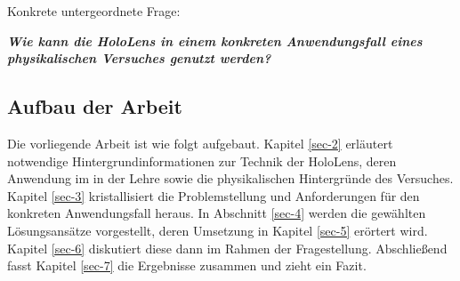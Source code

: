 Konkrete untergeordnete Frage:
\begin{center}
	\textit{\textbf{Wie kann die HoloLens in einem konkreten Anwendungsfall eines physikalischen Versuches genutzt werden?}}
\end{center}

\begin{comment}
\subsection{Aufgabenstellung}

Im Rahmen der Arbeit soll anhand der HoloLens untersucht werden, wie diese in der Physik-Lehre eingesetzt werden kann, um physikalische Inhalte zu vermitteln. Insbesondere soll betrachtet werden, wie physikalische Experimente mittels Mixed Reality Anwendungen durch zusätzliche Inhalte angereichert werden können.\\

\par
Dazu sind zunächst die technischen Möglichkeiten und Voraussetzungen der HoloLens zu betrachten und in Zusammenhang mit dem Anwendungsfall zu bringen. Weiterhin sind bestehende Ansätze im Einsatz von Mixed Reality Technologie in der Lehre, besonders in der Physik-Lehre, herauszuarbeiten und einzuordnen.

Davon ausgehend soll der Fragestellung anhand eines konkreten Beispiels nachgegangen werden. Für einen ausgewählten Versuchsaufbau sind die darzustellenden Objekte und Informationen sowie das Zusammenspiel dieser mit dem aufgebauten Experiment, der Umgebung und den Nutzern zu entwickeln. Für den ausgewählten Anwendungsfall soll eine Umsetzung mit der HoloLens konzipiert, designet und prototypisch implementiert werden.
\end{comment}

\subsection{Aufbau der Arbeit}
\label{sec-1-3}
Die vorliegende Arbeit ist wie folgt aufgebaut. Kapitel \ref{sec-2} erläutert notwendige Hintergrundinformationen zur Technik der HoloLens, deren Anwendung im in der Lehre sowie die physikalischen Hintergründe des Versuches. Kapitel \ref{sec-3} kristallisiert die Problemstellung und Anforderungen für den konkreten Anwendungsfall heraus. In Abschnitt \ref{sec-4} werden die gewählten Lösungsansätze vorgestellt, deren Umsetzung in Kapitel \ref{sec-5} erörtert wird. Kapitel \ref{sec-6} diskutiert diese dann im Rahmen der Fragestellung. Abschließend fasst Kapitel \ref{sec-7} die Ergebnisse zusammen und zieht ein Fazit.
